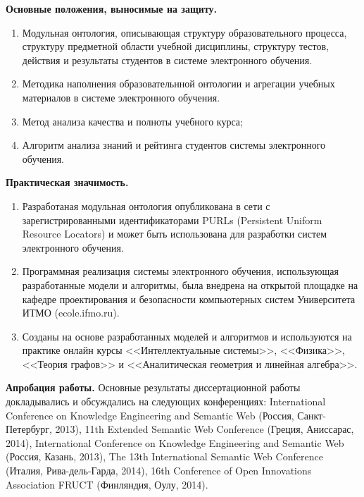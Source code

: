 \textbf{Основные положения, выносимые на защиту.}
\begin{enumerate}
 \item Модульная онтология, описывающая структуру образовательного процесса, структуру предметной области учебной дисциплины, структуру тестов, действия и результаты студентов в системе электронного обучения.
 \item Методика наполнения образовательнной онтологии и агрегации учебных материалов в системе электронного обучения.
 \item Метод анализа качества и полноты учебного курса;
 \item Алгоритм анализа знаний и рейтинга студентов системы электронного обучения.
 \end{enumerate}


\textbf{Практическая значимость.}
\begin{enumerate}
 \item Разработаная модульная онтология опубликована в сети с зарегистрированными идентификаторами PURLs (Persistent Uniform Resource Locators) и может быть использована для разработки систем электронного обучения.
 \item Программная реализация системы электронного обучения, использующая разработанные модели и алгоритмы, была внедрена на открытой площадке на кафедре проектирования и безопасности компьютерных систем Университета ИТМО (ecole.ifmo.ru). 
 \item Созданы на основе разработанных моделей и алгоритмов и используются на практике онлайн курсы 
<<Интеллектуальные системы>>, <<Физика>>, <<Теория графов>> и <<Аналитическая геометрия и линейная алгебра>>.
 \end{enumerate}
 
 


\textbf{Апробация работы.}
Основные результаты диссертационной работы докладывались и обсуждались на следующих конференциях:
International Conference on Knowledge Engineering and Semantic Web (Россия, Санкт-Петербург, 2013),
11th Extended Semantic Web Conference (Греция, Аниссарас, 2014), International Conference on Knowledge Engineering and Semantic Web (Россия, Казань, 2013), The 13th International Semantic Web Conference (Италия, Рива-дель-Гарда, 2014), 16th Conference of Open
Innovations Association FRUCT (Финляндия, Оулу, 2014).



